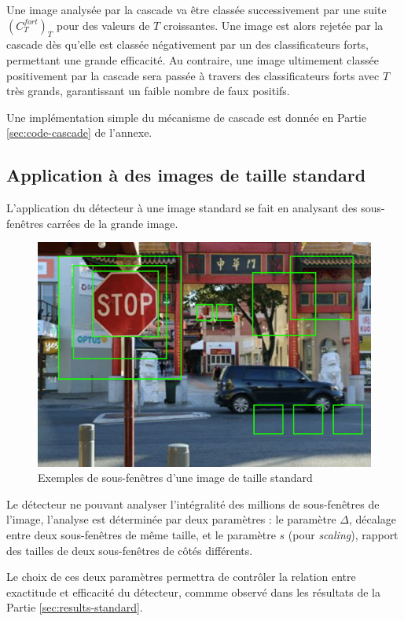 \documentclass[12pt,a4paper]{article}
\begin{document}
Une image analysée par la cascade va être classée successivement par une suite $(C_T^{fort})_T$ pour des valeurs de $T$ croissantes. Une image est alors rejetée par la cascade dès qu'elle est classée négativement par un des classificateurs forts, permettant une grande efficacité. Au contraire, une image ultimement classée positivement par la cascade sera passée à travers des classificateurs forts avec $T$ très grands, garantissant un faible nombre de faux positifs.

Une implémentation simple du mécanisme de cascade est donnée en Partie \ref{sec:code-cascade} de l'annexe.

\subsection{Application à des images de taille standard}
\label{sec:taille_standard}
L'application du détecteur à une image standard se fait en analysant des sous-fenêtres carrées de la grande image. 

\begin{figure}[h]
    \includegraphics[scale = 0.4]{sous-fenetre}
    \centering
    \caption{Exemples de sous-fenêtres d'une image de taille standard}
\end{figure}

Le détecteur ne pouvant analyser l'intégralité des millions de sous-fenêtres de l'image, l'analyse est déterminée par deux paramètres : le paramètre $\Delta$, décalage entre deux sous-fenêtres de même taille, et le paramètre $s$ (pour \textit{scaling}), rapport des tailles de deux sous-fenêtres de côtés différents.

Le choix de ces deux paramètres permettra de contrôler la relation entre exactitude et efficacité du détecteur, commme observé dans les résultats de la Partie \ref{sec:results-standard}.
\end{document}
